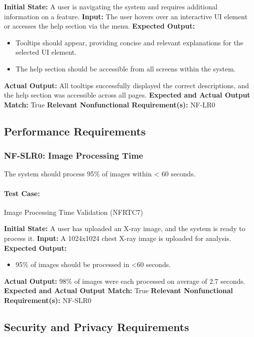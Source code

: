 \documentclass[12pt, titlepage]{article}
\begin{document}
\textbf{Initial State:} A user is navigating the system and requires additional information on a feature.  
\textbf{Input:} The user hovers over an interactive UI element or accesses the help section via the menu.  
\textbf{Expected Output:}
\begin{itemize}
    \item Tooltips should appear, providing concise and relevant explanations for the selected UI element.
    \item The help section should be accessible from all screens within the system.
\end{itemize}
\textbf{Actual Output:} All tooltips successfully displayed the correct descriptions, and the help section was accessible across all pages.  
\textbf{Expected and Actual Output Match:} True  
\textbf{Relevant Nonfunctional Requirement(s):} NF-LR0  

\subsection{Performance Requirements}

\subsubsection{NF-SLR0: Image Processing Time}
The system should process 95\% of images within < 60 seconds.

\paragraph{Test Case:} Image Processing Time Validation (NFRTC7)

\textbf{Initial State:} A user has uploaded an X-ray image, and the system is ready to process it.  
\textbf{Input:} A 1024x1024 chest X-ray image is uploaded for analysis.  
\textbf{Expected Output:}
\begin{itemize}
    \item 95\% of images should be processed in <60 seconds.
\end{itemize}
\textbf{Actual Output:} 98\% of images were each processed on average of 2.7 seconds.  
\textbf{Expected and Actual Output Match:} True  
\textbf{Relevant Nonfunctional Requirement(s):} NF-SLR0  

\subsection{Security and Privacy Requirements}
\end{document}
